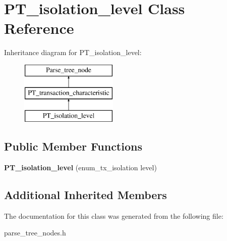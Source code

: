 \hypertarget{classPT__isolation__level}{}\section{P\+T\+\_\+isolation\+\_\+level Class Reference}
\label{classPT__isolation__level}
Inheritance diagram for P\+T\+\_\+isolation\+\_\+level\+:\begin{figure}[H]
\begin{center}
\leavevmode
\includegraphics[height=3.000000cm]{classPT__isolation__level}
\end{center}
\end{figure}
\subsection*{Public Member Functions}
\begin{DoxyCompactItemize}
\item 
\mbox{\label{classPT__isolation__level_a2766d84f480a933a647bca38a984e777}} 
{\bfseries P\+T\+\_\+isolation\+\_\+level} (enum\+\_\+tx\+\_\+isolation level)
\end{DoxyCompactItemize}
\subsection*{Additional Inherited Members}


The documentation for this class was generated from the following file\+:\begin{DoxyCompactItemize}
\item 
parse\+\_\+tree\+\_\+nodes.\+h\end{DoxyCompactItemize}
